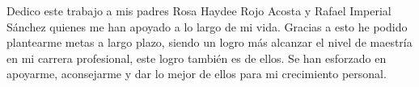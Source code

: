 

\begin{spacing}{1.5}

Dedico este trabajo a mis padres Rosa Haydee Rojo Acosta y Rafael Imperial Sánchez quienes me han apoyado a lo largo de mi vida. Gracias a esto he podido plantearme metas a largo plazo, siendo un logro más alcanzar el nivel de maestría en mi carrera profesional, este logro también es de ellos. Se han esforzado en apoyarme, aconsejarme y dar lo mejor de ellos para mi crecimiento personal.

\end{spacing}

